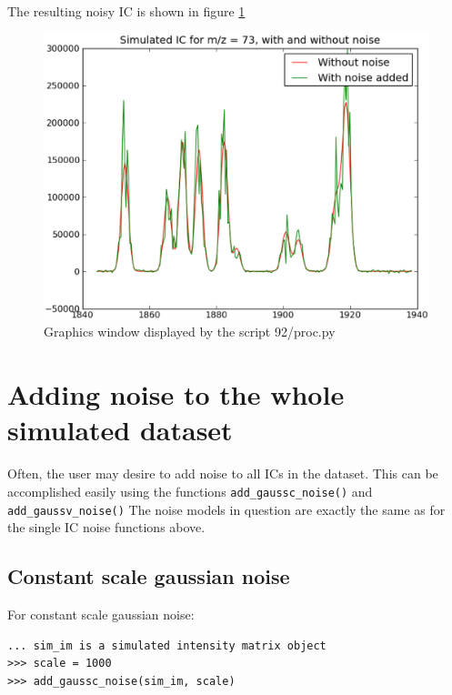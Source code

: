 The resulting noisy IC is shown in figure \ref{fig:gaussv-noise-ic}


\begin{figure}[h]
  \begin{center}
    \includegraphics[scale=0.25]{graphics/chapter09/test-92.eps}
  \end{center}
  \caption{Graphics window displayed by the script 92/proc.py}
  \label{fig:gaussv-noise-ic}
\end{figure}



\section{{Adding noise to the whole simulated dataset}}


Often, the user may desire to add noise to all ICs in the dataset. This can be 
accomplished easily using the functions {\tt add\_gaussc\_noise()} and {\tt add\_gaussv\_noise()}
The noise models in question are exactly the same as for the single IC noise functions above.

\subsection{Constant scale gaussian noise}

For constant scale gaussian noise:

\begin{verbatim}
... sim_im is a simulated intensity matrix object
>>> scale = 1000
>>> add_gaussc_noise(sim_im, scale)
\end{verbatim}

